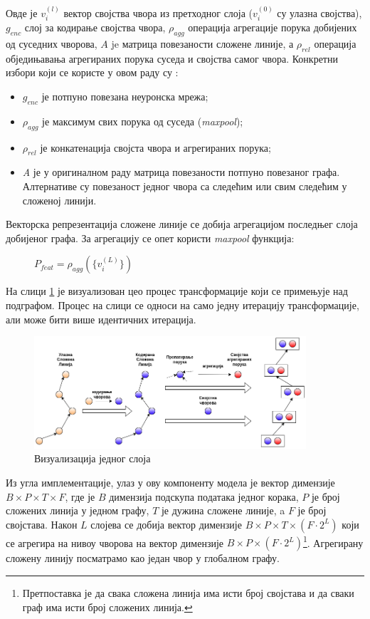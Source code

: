 \documentclass[11pt,oneside]{memoir}
\begin{document}
Овде је $v^{(l)}_{i}$ вектор својства чвора из претходног слоја ($v^{(0)}_{i}$ су улазна својства), $g_{enc}$ слој за кодирање
својства чвора, $\rho_{agg}$ операција агрегације порука добијених од суседних чворова, $A$ je матрица повезаности сложене линије, 
а $\rho_{rel}$ операција обједињавања агрегираних порука суседа и својства самог чвора. Конкретни избори
који се користе у овом раду су \cite{vectornet}:
\begin{itemize}
  \item $g_{enc}$ је потпуно повезана неуронска мрежа;
  \item $\rho_{agg}$ је максимум свих порука од суседа (\textit{maxpool});
  \item $\rho_{rel}$ је конкатенација својста чвора и агрегираних порука;
  \item \textit{A} је у оригиналном раду матрица повезаности потпуно повезаног графа. Алтернативе су повезаност једног чвора са следећим 
  или свим следећим у сложеној линији. 
\end{itemize}

\noindent Векторска репрезентација сложене линије
се добија агрегацијом последњег слоја добијеног графа. За агрегацију се опет користи \textit{maxpool} функција:

\begin{figure}[H]
  \centering
  $P_{feat} = \rho_{agg}(\{v^{(L)}_{i}\})$
\end{figure}

На слици \ref{vectornet-subgraph} је визуализован цео процес трансформације који се примењује над подграфом. Процес на слици се односи на само
једну итерацију трансформације, али може бити више идентичних итерација.

\begin{figure}[H]
  \centering
  \includegraphics[width=0.9\textwidth]{images/vectornet-subgraph-rs.drawio.png}
  \caption{Визуализација једног слоја \label{vectornet-subgraph}}
\end{figure}

Из угла имплементације, улаз у ову компоненту модела је вектор димензије $B\times P\times T\times F$,
где је $B$ димензија подскупа података једног корака, 
$P$ је број сложених линија у једном графу, $T$ је дужина сложене линије, a $F$ је број својстава. Након $L$ слојева се добија вектор димензије 
$B\times P\times T\times (F \cdot 2^{L})$ који се агрегира на нивоу чворова на вектор димензије
$B\times P\times (F \cdot 2^{L})$\footnote{Претпоставка је да свака сложена линија има исти број својстава и да сваки граф има исти број сложених линија.}.
Агрегирану сложену линију посматрамо као један чвор у глобалном графу.
         
\end{document}
